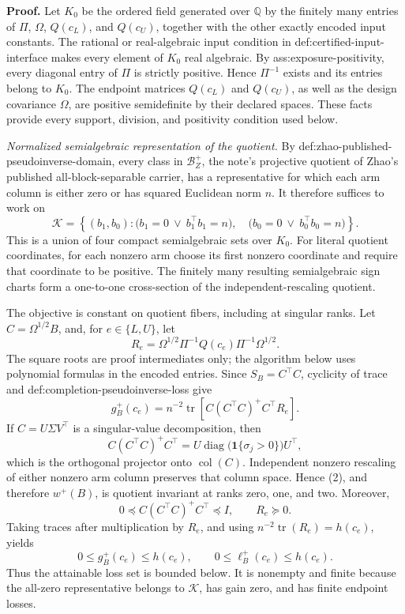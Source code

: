 \textbf{Proof.}
Let \(K_0\) be the ordered field generated over \(\mathbb Q\) by the finitely many entries of \(\Pi\), \(\Omega\), \(Q(c_L)\), and \(Q(c_U)\), together with the other exactly encoded input constants.  The rational or real-algebraic input condition in def:certified-input-interface makes every element of \(K_0\) real algebraic.  By ass:exposure-positivity, every diagonal entry of \(\Pi\) is strictly positive.  Hence \(\Pi^{-1}\) exists and its entries belong to \(K_0\).  The endpoint matrices \(Q(c_L)\) and \(Q(c_U)\), as well as the design covariance \(\Omega\), are positive semidefinite by their declared spaces.  These facts provide every support, division, and positivity condition used below.

\emph{Normalized semialgebraic representation of the quotient.}
By def:zhao-published-pseudoinverse-domain, every class in \(\mathcal B_Z^+\), the note's projective quotient of Zhao's published all-block-separable carrier, has a representative for which each arm column is either zero or has squared Euclidean norm \(n\).  It therefore suffices to work on
\[
\mathcal K=
\left\{(b_1,b_0):
\bigl(b_1=0\ \vee\ b_1^{\top}b_1=n\bigr),\quad
\bigl(b_0=0\ \vee\ b_0^{\top}b_0=n\bigr)
\right\}.
\tag{1}
\]
This is a union of four compact semialgebraic sets over \(K_0\).  For literal quotient coordinates, for each nonzero arm choose its first nonzero coordinate and require that coordinate to be positive.  The finitely many resulting semialgebraic sign charts form a one-to-one cross-section of the independent-rescaling quotient.

The objective is constant on quotient fibers, including at singular ranks.  Let \(C=\Omega^{1/2}B\), and, for \(e\in\{L,U\}\), let
\[
R_e=\Omega^{1/2}\Pi^{-1}Q(c_e)\Pi^{-1}\Omega^{1/2}.
\]
The square roots are proof intermediates only; the algorithm below uses polynomial formulas in the encoded entries.  Since \(S_B=C^{\top}C\), cyclicity of trace and def:completion-pseudoinverse-loss give
\[
g_B^+(c_e)
=n^{-2}\operatorname{tr}\!\left[
C(C^{\top}C)^+C^{\top}R_e
\right].
\tag{2}
\]
If \(C=U\Sigma V^{\top}\) is a singular-value decomposition, then
\[
C(C^{\top}C)^+C^{\top}
=U\operatorname{diag}\!\bigl(\mathbf 1\{\sigma_j>0\}\bigr)U^{\top},
\]
which is the orthogonal projector onto \(\operatorname{col}(C)\).  Independent nonzero rescaling of either nonzero arm column preserves that column space.  Hence (2), and therefore \(w^+(B)\), is quotient invariant at ranks zero, one, and two.  Moreover,
\[
0\preceq C(C^{\top}C)^+C^{\top}\preceq I,
\qquad R_e\succeq0.
\]
Taking traces after multiplication by \(R_e\), and using \(n^{-2}\operatorname{tr}(R_e)=h(c_e)\), yields
\[
0\le g_B^+(c_e)\le h(c_e),
\qquad
0\le \ell_B^+(c_e)\le h(c_e).
\tag{3}
\]
Thus the attainable loss set is bounded below.  It is nonempty and finite because the all-zero representative belongs to \(\mathcal K\), has gain zero, and has finite endpoint losses.

